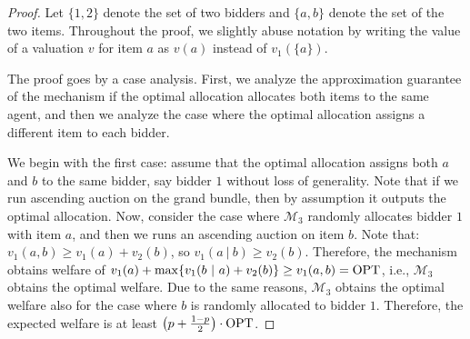 \begin{proof}
    Let $\{1,2\}$ denote the set of two bidders and $\{a,b\}$ denote the set of the two items. 
Throughout the proof, we slightly abuse notation by writing the value of a valuation $v$ for item $a$ as  $v(a)$ instead of $v_1(\{a\})$. 

The proof goes by a case  analysis.  First, we analyze the approximation guarantee of the mechanism if the optimal allocation allocates both items to the same agent, and then we analyze the case where the optimal allocation assigns a different item to each bidder. 

We begin with the first case:  assume that the optimal allocation assigns both $a$ and $b$ to the same bidder, say bidder $1$ without loss of generality. 
Note that if we run ascending auction on the grand bundle, then by assumption it outputs the optimal allocation.  Now, consider the case where $\mathcal M_3$ randomly allocates bidder $1$ with item $a$, and then we runs an ascending auction on item $b$.  Note that:
$v_1(a,b) \ge v_1(a)+v_2(b)$, so $v_1(a ~|~ b)\ge v_2(b)$. Therefore, the mechanism obtains welfare of $v_1(a)+\max\{v_1(b~|~a)+v_2(b)\}\ge v_1(a,b)=\text{OPT}$, i.e., $\mathcal M_3$ obtains the optimal welfare. Due to the same reasons, $\mathcal M_3$ obtains the optimal welfare also for the case where $b$ is randomly allocated to bidder $1$. 
Therefore, the expected welfare is  at least $\big(p+\frac{1-p}{2}\big)\cdot \text{OPT}$. 


\end{proof}

